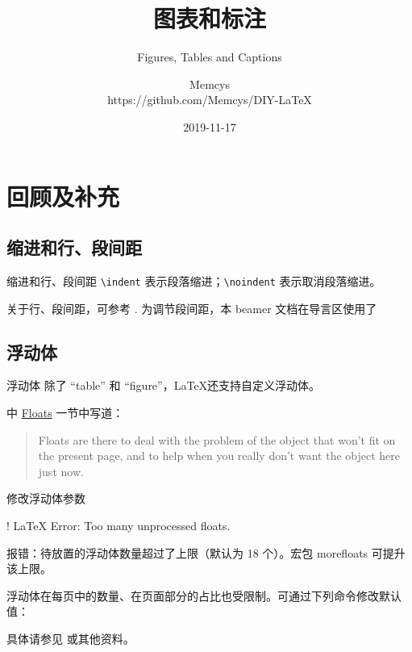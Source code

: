 \documentclass[final]{ctexbeamer}
\title{图表和标注}
\subtitle{Figures, Tables and Captions}
\author[Memcys]{Memcys \\ https://github.com/Memcys/DIY-LaTeX}
\institute[UCAS]{University of Chinese Academy of Sciences}
\date{2019-11-17}
\begin{document}
\titlepage

\setcounter{section}{-1}
\section{回顾及补充}
\subsection{缩进和行、段间距}
\begin{frame}[fragile]{缩进和行、段间距}
\verb+\indent+ 表示段落缩进；\verb+\noindent+ 表示取消段落缩进。

关于行、段间距，可参考 \cite{jianshu,liam}. 为调节段间距，本 beamer 文档在导言区使用了
\begin{texlst}
\setlength{\parskip}{\baselineskip}
\end{texlst}
\end{frame}


\subsection{浮动体}
\begin{frame}{浮动体}
除了 ``table'' 和 ``figure''，\LaTeX 还支持自定义浮动体。

\cite{wiki:floats} 中 \href{https://en.wikibooks.org/wiki/LaTeX/Floats,\_Figures\_and\_Captions\#Floats}{Floats} 一节中写道：
\begin{quote}
  Floats are there to deal with the problem of the object that won't fit on the present page, and to help when you really don't want the object here just now. 
\end{quote}
\end{frame}

\begin{frame}[fragile]{修改浮动体参数}
\begin{bashlst}
! LaTeX Error: Too many unprocessed floats.
\end{bashlst}
报错：待放置的浮动体数量超过了上限（默认为 18 个）。宏包 morefloats 可提升该上限。

浮动体在每页中的数量、在页面部分的占比也受限制。可通过下列命令修改默认值：
\begin{texlst}
\setcounter{topnumber}{2}
\setcounter{bottomnumber}{2}
\setcounter{totalnumber}{4}
\renewcommand{\topfraction}{0.85}
\renewcommand{\bottomfraction}{0.85}
\renewcommand{\textfraction}{0.15}
\renewcommand{\floatpagefraction}{0.7}
\end{texlst}
具体请参见 \cite{placement} 或其他资料。
\end{frame}
\end{document}
